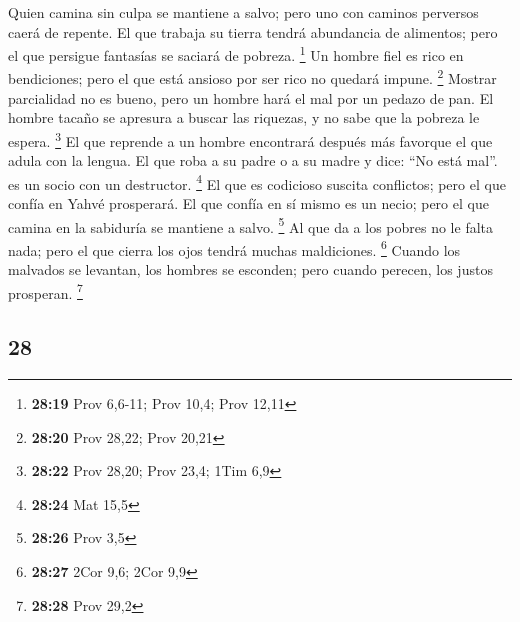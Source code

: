 \begin{paracol}{2}
 Quien camina sin culpa se mantiene a salvo; pero uno con
caminos perversos caerá de repente.  El que trabaja su
tierra tendrá abundancia de alimentos; pero el que persigue fantasías se
saciará de pobreza. \footnote{\textbf{28:19} Prov 6,6-11; Prov 10,4;
  Prov 12,11}  Un hombre fiel es rico en bendiciones;
pero el que está ansioso por ser rico no quedará impune. \footnote{\textbf{28:20}
  Prov 28,22; Prov 20,21}  Mostrar parcialidad no es
bueno, pero un hombre hará el mal por un pedazo de pan. 
El hombre tacaño se apresura a buscar las riquezas, y no sabe que la
pobreza le espera. \footnote{\textbf{28:22} Prov 28,20; Prov 23,4; 1Tim
  6,9}  El que reprende a un hombre encontrará después
más favorque el que adula con la lengua.  El que roba a
su padre o a su madre y dice: ``No está mal''. es un socio con un
destructor. \footnote{\textbf{28:24} Mat 15,5}  El que es
codicioso suscita conflictos; pero el que confía en Yahvé prosperará.
 El que confía en sí mismo es un necio; pero el que
camina en la sabiduría se mantiene a salvo. \footnote{\textbf{28:26}
  Prov 3,5}  Al que da a los pobres no le falta nada;
pero el que cierra los ojos tendrá muchas maldiciones. \footnote{\textbf{28:27}
  2Cor 9,6; 2Cor 9,9}  Cuando los malvados se levantan,
los hombres se esconden; pero cuando perecen, los justos prosperan.
\footnote{\textbf{28:28} Prov 29,2}

\switchcolumn
\begin{otherlanguage}{english}

\hypertarget{section-55}{%
\section{28}\label{section-55}}


\end{otherlanguage}
\end{paracol}
